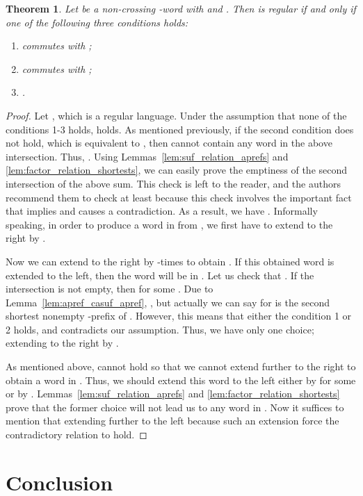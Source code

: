 \documentclass{article}
\theoremstyle{plain}
\newtheorem{theorem}{Theorem}
\theoremstyle{remark}
\begin{document}
\begin{theorem}\label{thm:32nonx_iff_regular}
	Let  be a non-crossing -word with  and . 
	Then  is regular if and only if one of the following three conditions holds: 
	\begin{enumerate}
	\item	 commutes with ; 
	\item	 commutes with ; 
	\item	. 
	\end{enumerate}
\end{theorem}
\begin{proof}
	Let , which is a regular language. 
	Under the assumption that none of the conditions 1-3 holds,  holds.
	As mentioned previously, if the second condition does not hold, which is equivalent to , then  cannot contain any word in the above intersection. 
	Thus, . 
	Using Lemmas~\ref{lem:suf_relation_aprefs} and \ref{lem:factor_relation_shortests}, we can easily prove the emptiness of the second intersection of the above sum. 
	This check is left to the reader, and the authors recommend them to check at least  because this check involves the important fact that  implies  and causes a contradiction. 
	As a result, we have . 
	Informally speaking, in order to produce a word in  from , we first have to extend  to the right by . 

	Now we can extend  to the right by  -times to obtain . 
	If this obtained word is extended to the left, then the word will be in . 
	Let us check that . 
	If the intersection is not empty, then  for some . 
	Due to Lemma~\ref{lem:apref_casuf_apref}, , but actually we can say  for  is the second shortest nonempty -prefix of . 
	However, this means that either the condition 1 or 2 holds, and contradicts our assumption. 
	Thus, we have only one choice; extending  to the right by . 

	As mentioned above,  cannot hold so that we cannot extend  further to the right to obtain a word in . 
	Thus, we should extend this word to the left either by  for some  or by . 
	Lemmas~\ref{lem:suf_relation_aprefs} and \ref{lem:factor_relation_shortests} prove that the former choice will not lead us to any word in . 
	Now it suffices to mention that extending  further to the left because such an extension force the contradictory relation  to hold. 
\end{proof}


\section{Conclusion}
\end{document}
